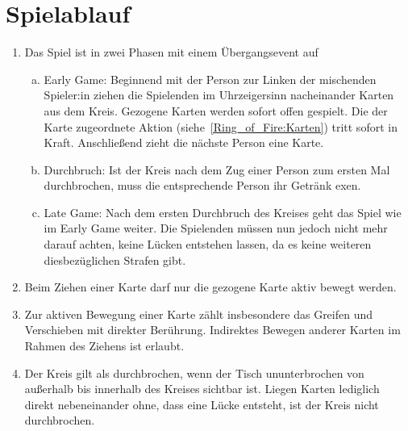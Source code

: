 \section{Spielablauf}
\begin{enumerate}[label={(\arabic*)}]
	\item
	Das Spiel ist in zwei Phasen mit einem Übergangsevent auf
	\begin{enumerate}[a.]
		\item
		Early Game:
		Beginnend mit der Person zur Linken der mischenden Spieler:in ziehen die Spielenden im Uhrzeigersinn nacheinander Karten aus dem Kreis.
		Gezogene Karten werden sofort offen gespielt.
		Die der Karte zugeordnete Aktion (siehe~\ref{Ring_of_Fire:Karten}) tritt sofort in Kraft.
		Anschließend zieht die nächste Person eine Karte.
		\item
		Durchbruch:
		Ist der Kreis nach dem Zug einer Person zum ersten Mal durchbrochen, muss die entsprechende Person ihr Getränk exen.
		\item
		Late Game:
		Nach dem ersten Durchbruch des Kreises geht das Spiel wie im Early Game weiter.
		Die Spielenden müssen nun jedoch nicht mehr darauf achten, keine Lücken entstehen lassen, da es keine weiteren diesbezüglichen Strafen gibt.
	\end{enumerate}

	\item
	Beim Ziehen einer Karte darf nur die gezogene Karte aktiv bewegt werden.

	\item
	Zur aktiven Bewegung einer Karte zählt insbesondere das Greifen und Verschieben mit direkter Berührung.
	Indirektes Bewegen anderer Karten im Rahmen des Ziehens ist erlaubt.

	\item
	Der Kreis gilt als durchbrochen, wenn der Tisch ununterbrochen von außerhalb bis innerhalb des Kreises sichtbar ist.
	Liegen Karten lediglich direkt nebeneinander ohne, dass eine Lücke entsteht, ist der Kreis nicht durchbrochen.
\end{enumerate}

